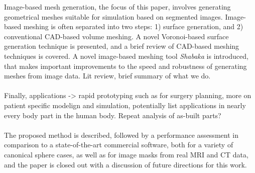 %
Image-based mesh generation, the focus of this paper, involves generating geometrical meshes suitable for simulation based on segmented images. Image-based meshing is often separated into two steps: 1) surface generation,  and 2) conventional CAD-based volume meshing. A novel Voronoi-based surface generation technique is presented, and a brief review of CAD-based meshing techniques is covered. A novel image-based meshing tool \textit{Shabaka} is introduced, that makes important improvements to the speed and robustness of generating meshes from image data. Lit review, brief summary of what we do.\\ \\
%
Finally, applications -> rapid prototyping such as for surgery planning, more on patient specific modelign and simulation, potentially list applications in nearly every body part in the human body. Repeat analysis of as-built parts? \\ \\
%
The proposed method is described, followed by a performance assessment in comparison to a state-of-the-art commercial software, both for a variety of canonical sphere cases, as well as for image masks from real MRI and CT data, and the paper is closed out with a discussion of future directions for this work.
